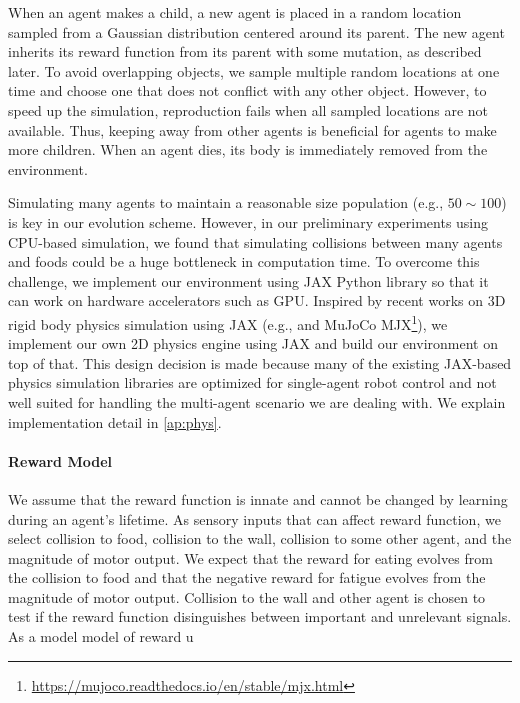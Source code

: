 When an agent makes a child, a new agent is placed in a random location sampled from a Gaussian distribution centered around its parent. The new agent inherits its reward function from its parent with some mutation, as described later. To avoid overlapping objects, we sample multiple random locations at one time and choose one that does not conflict with any other object. However, to speed up the simulation, reproduction fails when all sampled locations are not available. Thus, keeping away from other agents is beneficial for agents to make more children. When an agent dies, its body is immediately removed from the environment.

Simulating many agents to maintain a reasonable size population (e.g., $50\sim 100$) is key in our evolution scheme. However, in our preliminary experiments using CPU-based simulation, we found that simulating collisions between many agents and foods could be a huge bottleneck in computation time. To overcome this challenge, we implement our environment using JAX Python library \citep{jax2018github} so that it can work on hardware accelerators such as GPU. Inspired by recent works on 3D rigid body physics simulation using JAX (e.g., \citet{brax2021github} and MuJoCo \citep{todorov2012mujoco} MJX\footnote{\url{https://mujoco.readthedocs.io/en/stable/mjx.html}}), we implement our own 2D physics engine using JAX and build our environment on top of that. This design decision is made because many of the existing JAX-based physics simulation libraries are optimized for single-agent robot control and not well suited for handling the multi-agent scenario we are dealing with. We explain implementation detail in \cref{ap:phys}.

\paragraph{Reward Model}
We assume that the reward function is innate and cannot be changed by learning during an agent's lifetime. As sensory inputs that can affect reward function, we select  collision to food,  collision to the wall,  collision to some other agent, and  the magnitude of motor output. We expect that the reward for eating evolves from the collision to food and that the negative reward for fatigue evolves from the magnitude of motor output. Collision to the wall and other agent is chosen to test if the reward function disinguishes between important and unrelevant signals. As a model model of reward u


